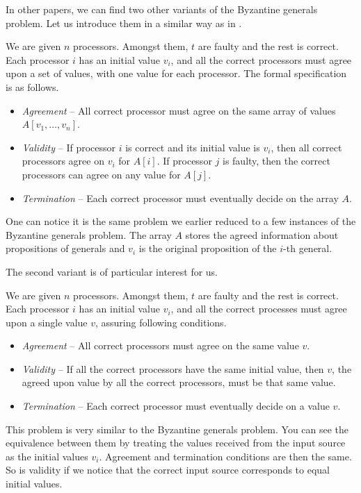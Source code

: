In other papers, we can find two other variants of the Byzantine generals problem. Let us introduce them in a similar way as in \cite{KS08}.

\begin{definition}
We are given $n$ processors. Amongst them, $t$ are faulty and the rest is correct. Each processor $i$ has an initial value $v_i$, and all the correct processors must agree upon a set of values, with one value for each processor. The formal specification is as follows.
\begin{itemize}
    \item \emph{Agreement} -- All correct processor must agree on the same array of values $A[v_1, \ldots,v_n]$.
    \item \emph{Validity} --  If processor $i$ is correct and its initial value is $v_i$, then all correct processors agree on $v_i$ for $A[i]$. If processor $j$ is faulty, then the correct processors can agree on any value for $A[j]$.
    \item \emph{Termination} -- Each correct processor must eventually decide on the array $A$.
\end{itemize}
\end{definition}
One can notice it is the same problem we earlier reduced to a few instances of the Byzantine generals problem. The array $A$ stores the agreed information about propositions of generals and $v_i$ is the original proposition of the $i$-th general.

The second variant is of particular interest for us.
\begin{definition}\label{in:def:consensus}
We are given $n$ processors. Amongst them, $t$ are faulty and the rest is correct. Each processor $i$ has an initial value $v_i$, and all the correct processes must agree upon a single value $v$, assuring following conditions.
\begin{itemize}
    \item \emph{Agreement} -- All correct processors must agree on the same value $v$.
    \item \emph{Validity} --  If all the correct processors have the same initial value, then $v$,
    the agreed upon value by all the correct processors, must be that same value.
    \item \emph{Termination} -- Each correct processor must eventually decide on a value $v$.
\end{itemize}
\end{definition}
This problem is very similar to the Byzantine generals problem. You can see the equivalence between them by treating the values received from the input source as the initial values $v_i$. Agreement and termination conditions are then the same. So is validity if we notice that the correct input source corresponds to equal initial values.